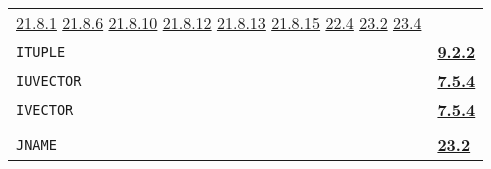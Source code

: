\documentclass[a4paper]{scrbook}
\begin{document}
\begin{longtable}[]{@{}ll@{}}
\begin{minipage}[t]{0.70\columnwidth}
\href{21-interrupts.md\#2181-char-received}{21.8.1} \href{21-interrupts.md\#2186-clock}{21.8.6}
\href{21-interrupts.md\#21810-sysdown}{21.8.10} \href{21-interrupts.md\#21812-ipc}{21.8.12}
\href{21-interrupts.md\#21813-inferior}{21.8.13} \href{21-interrupts.md\#21815-dangerous-interrupts}{21.8.15}
\href{22-storage-management.md\#224-garbage-collection-details}{22.4} \href{23-mdl-as-a-system-process.md\#232-names}{23.2}
\href{23-mdl-as-a-system-process.md\#234-inter-process-communication}{23.4}\strut
\end{minipage}\tabularnewline
\begin{minipage}[t]{0.24\columnwidth}\raggedright\strut
\texttt{ITUPLE}\strut
\end{minipage} & \begin{minipage}[t]{0.70\columnwidth}\raggedright\strut
\textbf{\href{09-functions.md\#922-tuple-the-subr-and-ituple}{9.2.2}}\strut
\end{minipage}\tabularnewline
\begin{minipage}[t]{0.24\columnwidth}\raggedright\strut
\texttt{IUVECTOR}\strut
\end{minipage} & \begin{minipage}[t]{0.70\columnwidth}\raggedright\strut
\textbf{\href{07-structured-objects.md\#754-ilist-ivector-iuvector-and-istring-1}{7.5.4}}\strut
\end{minipage}\tabularnewline
\begin{minipage}[t]{0.24\columnwidth}\raggedright\strut
\texttt{IVECTOR}\strut
\end{minipage} & \begin{minipage}[t]{0.70\columnwidth}\raggedright\strut
\textbf{\href{07-structured-objects.md\#754-ilist-ivector-iuvector-and-istring-1}{7.5.4}}\strut
\end{minipage}\tabularnewline
\begin{minipage}[t]{0.24\columnwidth}\raggedright\strut
\strut
\end{minipage} & \begin{minipage}[t]{0.70\columnwidth}\raggedright\strut
\strut
\end{minipage}\tabularnewline
\begin{minipage}[t]{0.24\columnwidth}\raggedright\strut
\texttt{JNAME}\strut
\end{minipage} & \begin{minipage}[t]{0.70\columnwidth}\raggedright\strut
\textbf{\href{23-mdl-as-a-system-process.md\#232-names}{23.2}}\strut
\end{minipage}\tabularnewline

\end{longtable}
\end{document}

